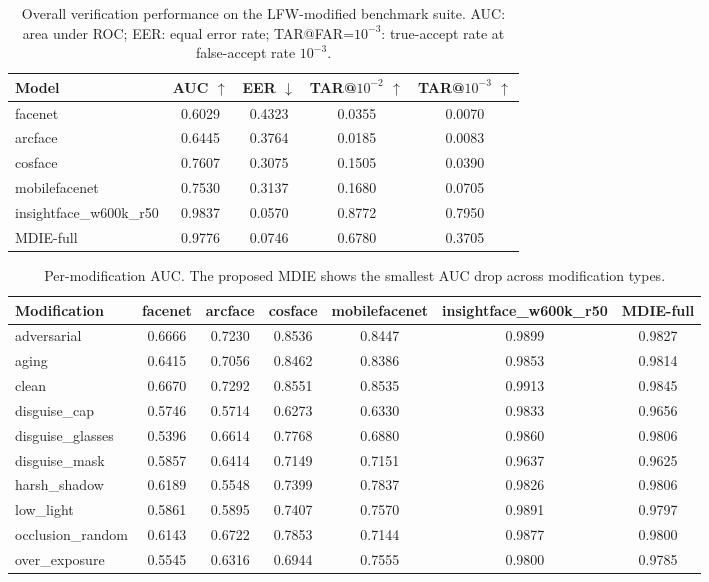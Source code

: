 \begin{table}[t]
\centering
\caption{Overall verification performance on the LFW-modified benchmark suite. AUC: area under ROC; EER: equal error rate; TAR@FAR=$10^{-3}$: true-accept rate at false-accept rate $10^{-3}$.}
\label{tab:overall}
\begin{tabular}{lcccc}
\hline
Model & AUC $\uparrow$ & EER $\downarrow$ & TAR@$10^{-2}$ $\uparrow$ & TAR@$10^{-3}$ $\uparrow$ \\
\hline
facenet & 0.6029 & 0.4323 & 0.0355 & 0.0070 \\
arcface & 0.6445 & 0.3764 & 0.0185 & 0.0083 \\
cosface & 0.7607 & 0.3075 & 0.1505 & 0.0390 \\
mobilefacenet & 0.7530 & 0.3137 & 0.1680 & 0.0705 \\
insightface_w600k_r50 & 0.9837 & 0.0570 & 0.8772 & 0.7950 \\
MDIE-full & 0.9776 & 0.0746 & 0.6780 & 0.3705 \\
\hline
\end{tabular}
\end{table}

\begin{table}[t]
\centering
\caption{Per-modification AUC. The proposed MDIE shows the smallest AUC drop across modification types.}
\label{tab:permod}
\begin{tabular}{lcccccc}
\hline
Modification & facenet & arcface & cosface & mobilefacenet & insightface_w600k_r50 & MDIE-full \\
\hline
adversarial & 0.6666 & 0.7230 & 0.8536 & 0.8447 & 0.9899 & 0.9827 \\
aging & 0.6415 & 0.7056 & 0.8462 & 0.8386 & 0.9853 & 0.9814 \\
clean & 0.6670 & 0.7292 & 0.8551 & 0.8535 & 0.9913 & 0.9845 \\
disguise_cap & 0.5746 & 0.5714 & 0.6273 & 0.6330 & 0.9833 & 0.9656 \\
disguise_glasses & 0.5396 & 0.6614 & 0.7768 & 0.6880 & 0.9860 & 0.9806 \\
disguise_mask & 0.5857 & 0.6414 & 0.7149 & 0.7151 & 0.9637 & 0.9625 \\
harsh_shadow & 0.6189 & 0.5548 & 0.7399 & 0.7837 & 0.9826 & 0.9806 \\
low_light & 0.5861 & 0.5895 & 0.7407 & 0.7570 & 0.9891 & 0.9797 \\
occlusion_random & 0.6143 & 0.6722 & 0.7853 & 0.7144 & 0.9877 & 0.9800 \\
over_exposure & 0.5545 & 0.6316 & 0.6944 & 0.7555 & 0.9800 & 0.9785 \\
\hline
\end{tabular}
\end{table}

